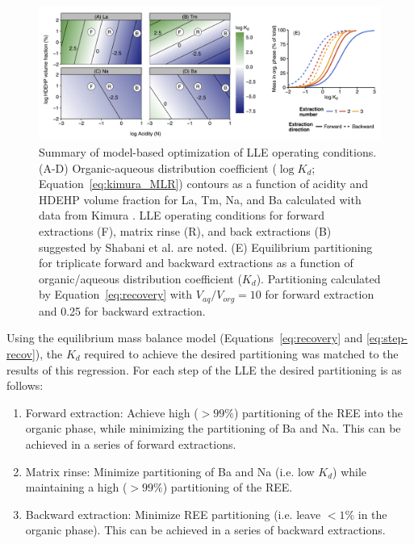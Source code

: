 \begin{figure}
\begin{center}
\includegraphics[width=\textwidth]{Ch4_figures/Kd-mod-plot.png}
\caption{Summary of model-based optimization of LLE operating conditions.
(A-D) Organic-aqueous distribution coefficient ($\log K_d$; Equation~\ref{eq:kimura_MLR}) contours as a function of acidity and HDEHP volume fraction for La, Tm, Na, and Ba calculated with data from Kimura \citep{Kimura_BCSJ_1960, Kimura_BCSJ_1961}.
LLE operating conditions for forward extractions (F), matrix rinse (R), and back extractions (B) suggested by Shabani et al. \citep{Shabani_AC_1990} are noted.
(E) Equilibrium partitioning for triplicate forward and backward extractions as a function of organic/aqueous distribution coefficient ($K_d$).
Partitioning calculated by Equation~\ref{eq:recovery} with $V_{aq}/V_{org} = 10$ for forward extraction and 0.25 for backward extraction.}
\label{fig:MLR-results}
\end{center}
\end{figure}


Using the equilibrium mass balance model (Equations~\ref{eq:recovery} and \ref{eq:step-recov}), the $K_d$ required to achieve the desired partitioning was matched to the results of this regression.
For each step of the LLE the desired partitioning is as follows:
\begin{enumerate}
	\item Forward extraction: Achieve high ($>99\%$) partitioning of the REE into the organic phase, while minimizing the partitioning of Ba and Na.
This can be achieved in a series of forward extractions.
	\item	Matrix rinse: Minimize partitioning of Ba and Na (i.e. low $K_d$) while maintaining a high ($>99\%$) partitioning of the REE. 
	\item Backward extraction: Minimize REE partitioning (i.e. leave $<1\%$ in the organic phase).
	This can be achieved in a series of backward extractions.
\end{enumerate}

